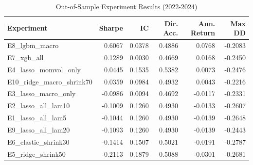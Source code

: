 \begin{table}
\caption{Out-of-Sample Experiment Results (2022-2024)}
\label{tab:oos_experiments}
\begin{tabular}{lrrrrr}
\toprule
Experiment & Sharpe & IC & Dir. Acc. & Ann. Return & Max DD \\
\midrule
E8_lgbm_macro & 0.6067 & 0.0378 & 0.4886 & 0.0768 & -0.2083 \\
E7_xgb_all & 0.1289 & 0.0030 & 0.4669 & 0.0168 & -0.2450 \\
E4_lasso_momvol_only & 0.0445 & 0.1535 & 0.5382 & 0.0073 & -0.2476 \\
E10_ridge_macro_shrink70 & 0.0359 & 0.0984 & 0.4932 & 0.0043 & -0.2216 \\
E3_lasso_macro_only & -0.0986 & 0.0094 & 0.4692 & -0.0117 & -0.2331 \\
E2_lasso_all_lam10 & -0.1009 & 0.1260 & 0.4930 & -0.0133 & -0.2607 \\
E1_lasso_all_lam5 & -0.1044 & 0.1260 & 0.4930 & -0.0139 & -0.2648 \\
E9_lasso_all_lam20 & -0.1093 & 0.1260 & 0.4930 & -0.0139 & -0.2443 \\
E6_elastic_shrink30 & -0.1414 & 0.1507 & 0.5021 & -0.0191 & -0.2787 \\
E5_ridge_shrink50 & -0.2113 & 0.1879 & 0.5088 & -0.0301 & -0.2681 \\
\bottomrule
\end{tabular}
\end{table}
